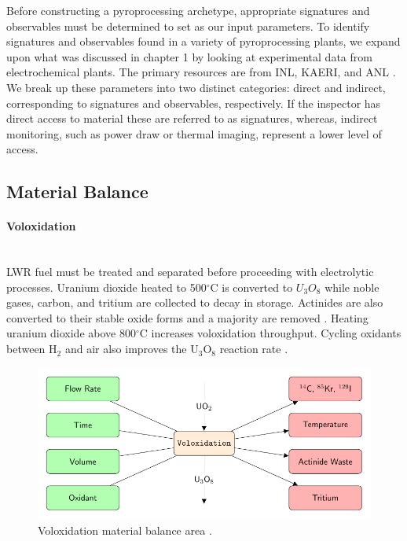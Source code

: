 Before constructing a pyroprocessing archetype, appropriate signatures and observables must be determined to set as our input parameters. To identify signatures and observables 
found in a variety of pyroprocessing plants, we expand upon what was discussed in chapter 1 by looking at experimental data from electrochemical plants. The primary resources are from 
INL, KAERI, and ANL \cite{lee_korean_2011,flowsheet_1998,michael_f._simpson_developments_2012,li_electrorefining_2005}. We break up these parameters into two distinct categories: direct and indirect, corresponding to signatures and observables, respectively. If the inspector has direct access to material these are referred to as signatures, whereas, indirect monitoring, such as
power draw or thermal imaging, represent a lower level of access. 

\subsection{Material Balance}
\paragraph{Voloxidation} \mbox{}\\
\gls{LWR} fuel must be treated and separated before proceeding with electrolytic processes. Uranium dioxide heated to 
500$^{\circ}$C is converted to $U_3O_8$ while noble gases, carbon, and tritium are collected to decay in storage. 
Actinides are also converted to their stable oxide forms and a majority are removed \cite{flowsheet_1998,jubin_spent_2009}. 
Heating uranium dioxide above 800$^{\circ}$C increases voloxidation throughput.
Cycling oxidants between H$_2$ and air also improves the U$_3$O$_8$ reaction rate \cite{jubin_spent_2009}.

\begin{figure}[h]
	\centering
	\includegraphics[width=0.9\linewidth]{images/volox}
	\caption{Voloxidation material balance area \cite{jubin_spent_2009}.}
	\label{fig:volox}
\end{figure}

